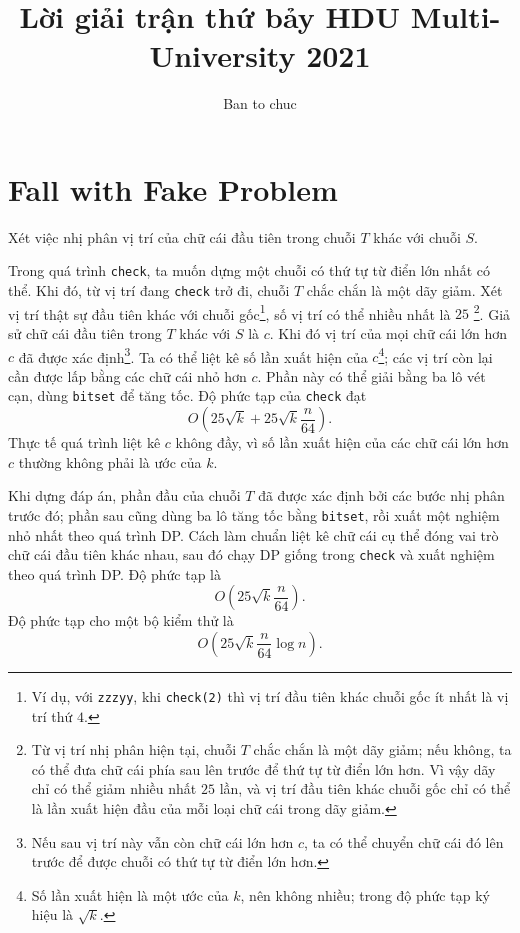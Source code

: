 \documentclass[11pt]{article}
\title{Lời giải trận thứ bảy HDU Multi-University 2021}
\author{Ban to chuc}
\date{}
\begin{document}
\maketitle


\section{Fall with Fake Problem}

Xét việc nhị phân vị trí của chữ cái đầu tiên trong chuỗi $T$ khác với chuỗi
$S$.

Trong quá trình \texttt{check}, ta muốn dựng một chuỗi có thứ tự từ điển lớn
nhất có thể. Khi đó, từ vị trí đang \texttt{check} trở đi, chuỗi $T$ chắc chắn
là một dãy giảm. Xét vị trí thật sự đầu tiên khác với chuỗi gốc\footnote{Ví
dụ, với \texttt{zzzyy}, khi \texttt{check(2)} thì vị trí đầu tiên khác chuỗi
gốc ít nhất là vị trí thứ $4$.}, số vị trí có thể nhiều nhất là $25$
\footnote{Từ vị trí nhị phân hiện tại, chuỗi $T$ chắc chắn là một dãy giảm;
nếu không, ta có thể đưa chữ cái phía sau lên trước để thứ tự từ điển lớn hơn.
Vì vậy dãy chỉ có thể giảm nhiều nhất $25$ lần, và vị trí đầu tiên khác chuỗi
gốc chỉ có thể là lần xuất hiện đầu của mỗi loại chữ cái trong dãy giảm.}.
Giả sử chữ cái đầu tiên trong $T$ khác với $S$ là $c$. Khi đó vị trí của mọi
chữ cái lớn hơn $c$ đã được xác định\footnote{Nếu sau vị trí này vẫn còn chữ
cái lớn hơn $c$, ta có thể chuyển chữ cái đó lên trước để được chuỗi có thứ tự
từ điển lớn hơn.}. Ta có thể liệt kê số lần xuất hiện của $c$\footnote{Số lần
xuất hiện là một ước của $k$, nên không nhiều; trong độ phức tạp ký hiệu là
$\sqrt{k}$.}; các vị trí còn lại cần được lấp bằng các chữ cái nhỏ hơn $c$.
Phần này có thể giải bằng ba lô vét cạn, dùng \texttt{bitset} để tăng tốc.
Độ phức tạp của \texttt{check} đạt
\[
  O\!\left(25\sqrt{k}+25\sqrt{k}\frac{n}{64}\right).
\]
Thực tế quá trình liệt kê $c$ không đầy, vì số lần xuất hiện của các chữ cái
lớn hơn $c$ thường không phải là ước của $k$.

Khi dựng đáp án, phần đầu của chuỗi $T$ đã được xác định bởi các bước nhị phân
trước đó; phần sau cũng dùng ba lô tăng tốc bằng \texttt{bitset}, rồi xuất một
nghiệm nhỏ nhất theo quá trình DP. Cách làm chuẩn liệt kê chữ cái cụ thể đóng
vai trò chữ cái đầu tiên khác nhau, sau đó chạy DP giống trong \texttt{check}
và xuất nghiệm theo quá trình DP. Độ phức tạp là
\[
  O\!\left(25\sqrt{k}\frac{n}{64}\right).
\]
Độ phức tạp cho một bộ kiểm thử là
\[
  O\!\left(25\sqrt{k}\frac{n}{64}\log n\right).
\]
\end{document}
